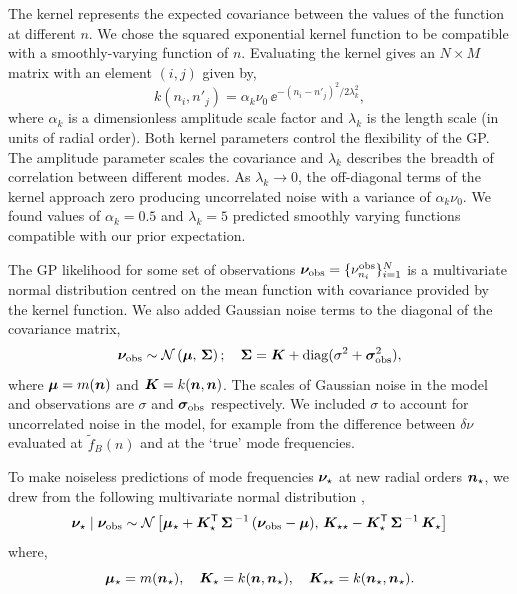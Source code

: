 The kernel represents the expected covariance between the values of the function at different \(n\). We chose the squared exponential kernel function to be compatible with a smoothly-varying function of \(n\). Evaluating the kernel gives an \(N \times M\) matrix with an element \((i,j)\) given by,
%
\begin{equation}
    k(n_i, n'_j) = \alpha_k \nu_0 \, \ee^{- (n_i - n'_j)^2 / 2\lambda_k^2},
\end{equation}
%
where \(\alpha_k\) is a dimensionless amplitude scale factor and \(\lambda_k\) is the length scale (in units of radial order). Both kernel parameters control the flexibility of the GP. The amplitude parameter scales the covariance and \(\lambda_k\) describes the breadth of correlation between different modes. As \(\lambda_k \rightarrow 0\), the off-diagonal terms of the kernel approach zero producing uncorrelated noise with a variance of \(\alpha_k\nu_0\). We found values of \(\alpha_k = 0.5\) and \(\lambda_k = 5\) predicted smoothly varying functions compatible with our prior expectation.

The GP likelihood for some set of observations \(\bm{\nu}_{{\mathrm{obs}}} = \{\nu_{n_i}^{{\mathrm{obs}}}\}_{i=1}^N\) is a multivariate normal distribution centred on the mean function with covariance provided by the kernel function. We also added Gaussian noise terms to the diagonal of the covariance matrix,
%
\begin{equation}
    \bm{\nu}_{{\mathrm{obs}}} \sim \mathcal{N}\left( \bm{\mu}, \,  \bm{\Sigma} \right); \quad \bm{\Sigma} = \bm{K} + \mathrm{diag}(\sigma^2 + \bm{\sigma}_{{\mathrm{obs}}}^2), \label{eq:gp-like}
\end{equation}
%
where \(\bm{\mu} = m(\bm{n})\) and \(\bm{K} = k(\bm{n}, \bm{n})\). The scales of Gaussian noise in the model and observations are \(\sigma\) and \(\bm{\sigma}_{{\mathrm{obs}}}\) respectively. We included \(\sigma\) to account for uncorrelated noise in the model, for example from the difference between \(\delta\nu\) evaluated at \(\tilde{f}_B(n)\) and at the `true' mode frequencies.

To make noiseless predictions of mode frequencies \(\bm{\nu}_\star\) at new radial orders \(\bm{n}_\star\), we drew from the following multivariate normal distribution \citep{Rasmussen.Williams2006},
%
\begin{equation}
    \bm{\nu}_\star \mid \bm{\nu}_{{\mathrm{obs}}} \sim \mathcal{N} \left[ \bm{\mu}_\star + \bm{K}_\star^\mathsf{T} \, \bm{\Sigma}^{\,-1} \, (\bm{\nu}_{{\mathrm{obs}}} - \bm{\mu}), \, \bm{K}_{\star\star} - \bm{K}_\star^\mathsf{T} \, \bm{\Sigma}^{\,-1} \, \bm{K}_\star \right]
\end{equation}
%
where,
%
\begin{equation*}
    \bm{\mu}_\star = m(\bm{n}_\star), \quad \bm{K}_\star = k(\bm{n}, \bm{n}_\star), \quad \bm{K}_{\star\star} = k(\bm{n}_\star, \bm{n}_\star).
\end{equation*}
%

